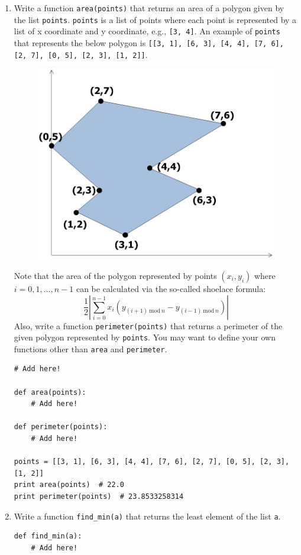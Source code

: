 \documentclass[../main.tex]{subfiles}
\begin{document}
\begin{enumerate}
\item Write a function \texttt{area(points)} that returns an area of a polygon given by the list \texttt{points}.
\texttt{points} is a list of points where each point is represented by a list of x coordinate and y coordinate, e.g., \texttt{[3, 4]}.
An example of \texttt{points} that represents the below polygon is \texttt{[[3, 1], [6, 3], [4, 4], [7, 6], [2, 7], [0, 5], [2, 3], [1, 2]]}.
\begin{figure}[H]
\centering
\includegraphics[width=0.5\linewidth]{"./lectures/lecture4_q6"}
\label{fig:lecture4q6}
\end{figure}
Note that the area of the polygon represented by points $(x_i, y_i)$ where $i = 0, 1, \dots, n - 1$ can be calculated via the so-called shoelace formula:
\[
\frac 12 \left| \sum_{i = 0}^{n - 1} x_i \left(y_{(i + 1)\ \mathrm{mod}\ n} - y_{(i - 1)\ \mathrm{mod}\ n}\right)\right|
\]
Also, write a function \texttt{perimeter(points)} that returns a perimeter of the given polygon represented by \texttt{points}.
You may want to define your own functions other than \texttt{area} and \texttt{perimeter}.
\begin{verbatim}
# Add here!

def area(points):
	# Add here!
	
def perimeter(points):
	# Add here!
	
points = [[3, 1], [6, 3], [4, 4], [7, 6], [2, 7], [0, 5], [2, 3], [1, 2]]
print area(points)  # 22.0
print perimeter(points)  # 23.8533258314
\end{verbatim}

\item Write a function \texttt{find\_min(a)} that returns the least element of the list \texttt{a}.
\begin{verbatim}
def find_min(a):
	# Add here!
	

\end{verbatim}
\end{enumerate}
\end{document}
